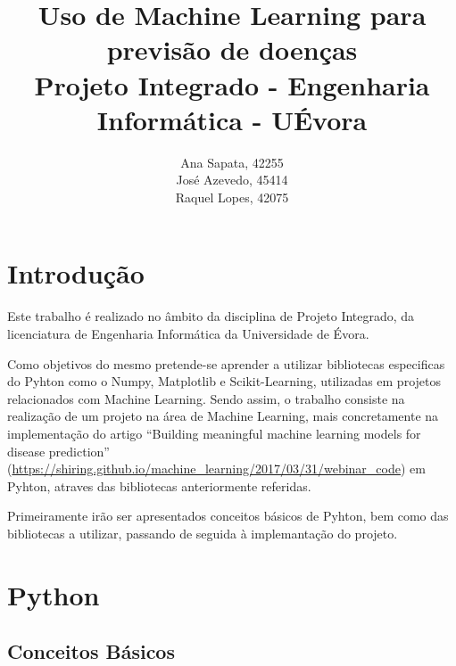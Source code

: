 \documentclass{article}
\title{%
		Uso de Machine Learning para previs\~ao de doen\c cas \\
		\large Projeto Integrado - Engenharia Inform\'atica - U\'Evora
		}
\author{Ana Sapata, 42255 \\
		Jos\'e Azevedo, 45414 \\
		Raquel Lopes, 42075}
\begin{document}
  \maketitle
  \pagebreak
  \section{Introdu\c c\~ao}
  
\qquad \quad Este trabalho \'e realizado no \^ambito da disciplina de Projeto Integrado, da licenciatura de Engenharia Inform\'atica da Universidade de \'Evora.

\quad Como objetivos do mesmo pretende-se aprender a utilizar bibliotecas especificas do Pyhton como o Numpy, Matplotlib e Scikit-Learning, utilizadas em projetos relacionados com Machine Learning. Sendo assim, o trabalho consiste na realização de um projeto na \'area de Machine Learning, mais concretamente na implementa\c c\~ao do artigo “Building meaningful machine learning models for disease prediction” (\url{https://shiring.github.io/machine_learning/2017/03/31/webinar_code}) em Pyhton, atraves das bibliotecas anteriormente referidas.

\quad Primeiramente ir\~ao ser apresentados conceitos b\'asicos de Pyhton, bem como das bibliotecas a utilizar, passando de seguida \`a implemanta\c c\~ao do projeto.
  \section{Python}
  \subsection{Conceitos B\'asicos}
  
\end{document}
